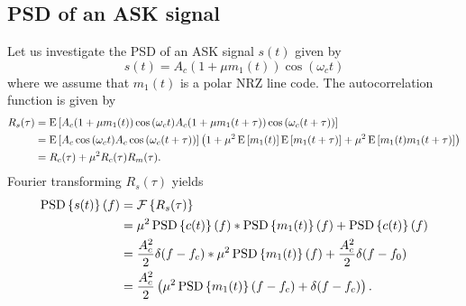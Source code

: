 \documentclass[11pt,titlepage]{report}
\begin{document}
\begin{appendices}
\subsection{PSD of an ASK signal}
Let us investigate the PSD of an ASK signal $s(t)$ given by
\begin{equation*}
	s(t) = A_c (1+\mu m_1(t)) \cos{(\omega_c t)}
\end{equation*}
where we assume that $m_1(t)$ is a polar NRZ line code. The autocorrelation function is given by
\begin{align*}
	R_s(\tau) &=\operatorname{E}\left[A_c (1+\mu m_1(t)) \cos{(\omega_c t)} A_c (1+\mu m_1(t+\tau)) \cos{(\omega_c (t+\tau))}\right] \\
	&=\operatorname{E}\left[A_c \cos{(\omega_c t)} A_c \cos{(\omega_c (t+\tau))} \right]\left( 1 + \mu^2 \operatorname{E}\left[m_1(t)\right] \operatorname{E}\left[m_1(t+\tau)\right]+ \mu^2 \operatorname{E}\left[m_1(t) m_1(t+\tau)\right]\right) \\
	&=R_c(\tau) + \mu^2 R_c(\tau) R_m(\tau).
\end{align*}
Fourier transforming $R_s(\tau)$ yields
\begin{align}
	\operatorname{PSD}\left\{s(t)\right\}(f) &= \mathcal{F}\left\{R_s(\tau)\right\} \nonumber \\
	&= \mu^2 \operatorname{PSD}\left\{c(t)\right\}(f) \ast \operatorname{PSD}\left\{m_1(t)\right\}(f) + \operatorname{PSD}\left\{c(t)\right\}(f) \nonumber \\
	&= \frac{A_c^2}{2} \delta(f-f_c) \ast \mu^2 \operatorname{PSD}\left\{m_1(t)\right\}(f) + \frac{A_c^2}{2} \delta(f-f_0) \nonumber \\
	&= \frac{A_c^2}{2} \left( \mu^2 \operatorname{PSD}\left\{m_1(t)\right\}(f-f_c) + \delta(f-f_c) \right). \label{eq:psd-ask}
\end{align}

\end{appendices}
\end{document}
